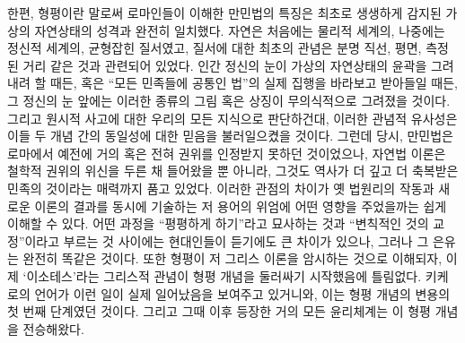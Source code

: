 한편, 형평이란 말로써 로마인들이 이해한 만민법의 특징은
최초로 생생하게 감지된 가상의 자연상태의 성격과 완전히 일치했다.
자연은 처음에는 물리적 세계의, 나중에는 정신적 세계의, 균형잡힌 질서였고,
질서에 대한 최초의 관념은 분명 직선, 평면, 측정된 거리 같은 것과
관련되어 있었다.
인간 정신의 눈이 가상의 자연상태의 윤곽을 그려내려 할 때든,
혹은 ``모든 민족들에 공통인 법''의 실제 집행을 바라보고 받아들일 때든,
그 정신의 눈 앞에는 이러한 종류의 그림 혹은 상징이 무의식적으로 그려졌을 것이다.
그리고 원시적 사고에 대한 우리의 모든 지식으로 판단하건대,
이러한 관념적 유사성은 이들 두 개념 간의 동일성에 대한 믿음을
불러일으켰을 것이다.
그런데 당시,
만민법은 로마에서 예전에 거의 혹은 전혀 권위를 인정받지 못하던 것이었으나,
자연법 이론은 철학적 권위의 위신을 두른 채 들어왔을 뿐 아니라,
그것도 역사가 더 깊고 더 축복받은 민족의 것이라는 매력까지 품고 있었다.
이러한 관점의 차이가
옛 법원리의 작동과 새로운 이론의 결과를 동시에 기술하는 저 용어의 위엄에
어떤 영향을 주었을까는 쉽게 이해할 수 있다.
어떤 과정을 ``평평하게 하기''라고 묘사하는 것과
``변칙적인 것의 교정''이라고 부르는 것 사이에는
현대인들이 듣기에도 큰 차이가 있으나, 그러나
그 은유는 완전히 똑같은 것이다.
또한 형평이 저 그리스 이론을 암시하는 것으로 이해되자,
이제 `이소테스'라는 그리스적 관념이 형평 개념을 둘러싸기 시작했음에 틀림없다.
키케로의 언어가 이런 일이 실제 일어났음을 보여주고 있거니와,
이는 형평 개념의 변용의 첫 번째 단계였던 것이다.
그리고 그때 이후 등장한 거의 모든 윤리체계는 이 형평 개념을 전승해왔다.

